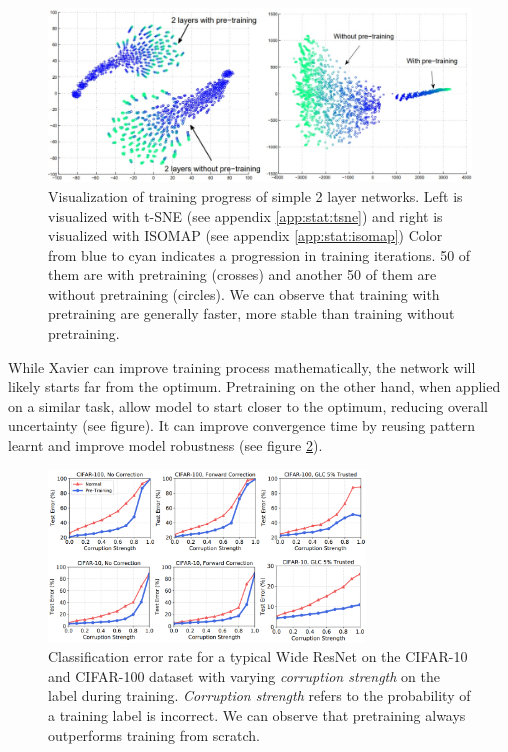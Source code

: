 \begin{figure}
    \centering
    \includegraphics[width=1\textwidth]{images/introduction/pretrain_vis.jpg}
    \caption{Visualization of training progress of simple 2 layer networks. Left is visualized with t-SNE (see appendix \ref{app:stat:tsne}) and right is visualized with ISOMAP (see appendix \ref{app:stat:isomap}) Color from blue to cyan indicates a progression in training iterations. 50 of them are with pretraining (crosses) and another 50 of them are without pretraining (circles). We can observe that training with pretraining are generally faster, more stable than training without pretraining.\cite{erhanWhyDoesUnsupervised}} 
    \label{fig:pretrain_tsne}
\end{figure}

While Xavier can improve training process mathematically, the network will likely starts far from the optimum. Pretraining on the other hand, when applied on a similar task, allow model to start closer to the optimum, reducing overall uncertainty (see figure). It can improve convergence time by reusing pattern learnt and improve model robustness\cite{hendrycksUsingPreTrainingCan2019} (see figure \ref{fig:pretrain_robustness}).


\begin{figure}
    \centering
    \includegraphics[width=0.75\textwidth]{images/introduction/pretrain_robustness.png}
    \caption{Classification error rate for a typical Wide ResNet\cite{zagoruykoWideResidualNetworks2017} on the CIFAR-10 and CIFAR-100 dataset with varying \textit{corruption strength} on the label during training. \textit{Corruption strength} refers to the probability of a training label is incorrect. We can observe that pretraining always outperforms training from scratch.} 
    \label{fig:pretrain_robustness}
\end{figure}

